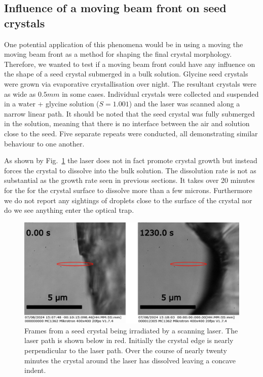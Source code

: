 \subsection{Influence of a moving beam front on seed crystals}
\label{sec:seed_crystals}
One potential application of this phenomena would be in using 
a moving the moving beam front as a method for shaping the 
final crystal morphology. Therefore, we wanted to test if a 
moving beam front could have any influence on the shape of a
seed crystal submerged in a bulk solution. Glycine seed crystals 
were grown via evaporative crystallisation over night. The 
resultant crystals were as wide as $0.5 mm$ in some cases. 
Individual crystals were collected and suspended in a water 
+ glycine solution ($S = 1.001$) and the laser was scanned 
along a narrow linear path. It should be noted that the seed 
crystal was fully submerged in the solution, meaning that there
is no interface between the air and solution close to the seed.
Five separate repeats were conducted, all demonstrating similar
behaviour to one another.  

As shown by Fig.~\ref{fig:seed_crystals} the laser does not 
in fact promote crystal growth but instead forces the crystal 
to dissolve into the bulk solution. The dissolution rate is not 
as substantial as the growth rate seen in previous sections. 
It takes over 20 minutes for the for the crystal surface to 
dissolve more than a few microns. Furthermore we do not report 
any sightings of droplets close to the surface of the crystal 
nor do we see anything enter the optical trap.
\begin{figure}[h!]
	\centering
	\includegraphics[width=\linewidth]{seed_crystals.pdf}
	\caption{Frames from a seed crystal being irradiated by a 
		scanning laser. The laser path is shown below in red. 
		Initially the crystal edge is nearly perpendicular to 
		the laser path. Over the course of nearly twenty minutes 
		the crystal around the laser has dissolved leaving a 
		concave indent.}
	\label{fig:seed_crystals}
\end{figure}

